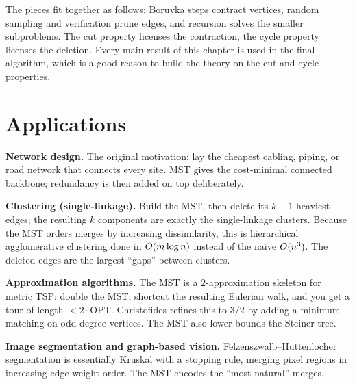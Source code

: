 \begin{aestheticbox}
The pieces fit together as follows: Boruvka steps contract vertices, random sampling and verification prune edges, and recursion solves the smaller subproblems. The cut property licenses the contraction, the cycle property licenses the deletion. Every main result of this chapter is used in the final algorithm, which is a good reason to build the theory on the cut and cycle properties.
\end{aestheticbox}

\section{Applications}

\begin{applicationbox}
\textbf{Network design.} The original motivation: lay the cheapest cabling, piping, or road network that connects every site. MST gives the cost-minimal connected backbone; redundancy is then added on top deliberately.
\end{applicationbox}

\begin{applicationbox}
\textbf{Clustering (single-linkage).} Build the MST, then delete its $k-1$ heaviest edges; the resulting $k$ components are exactly the single-linkage clusters. Because the MST orders merges by increasing dissimilarity, this is hierarchical agglomerative clustering done in $O(m\log n)$ instead of the naive $O(n^3)$. The deleted edges are the largest ``gaps'' between clusters.
\end{applicationbox}

\begin{applicationbox}
\textbf{Approximation algorithms.} The MST is a $2$-approximation skeleton for metric TSP: double the MST, shortcut the resulting Eulerian walk, and you get a tour of length $<2\cdot\mathrm{OPT}$. Christofides refines this to $3/2$ by adding a minimum matching on odd-degree vertices. The MST also lower-bounds the Steiner tree.
\end{applicationbox}

\begin{applicationbox}
\textbf{Image segmentation and graph-based vision.} Felzenszwalb--Huttenlocher segmentation is essentially Kruskal with a stopping rule, merging pixel regions in increasing edge-weight order. The MST encodes the ``most natural'' merges.
\end{applicationbox}

